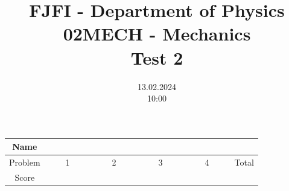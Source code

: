 \documentclass[a4paper,12pt]{article}
\title{{\Large FJFI - Department of Physics} \\ 
                  02MECH - Mechanics \\ 
          {\Large \textbf{Test 2}}\vspace{-1cm}}
\date{13.02.2024 \\ 10:00}
\author{}
\begin{document}
\maketitle
\vspace{-1.5em}

\begin{center}
    \renewcommand{\arraystretch}{2}
    \begin{tabular}{ |c|c|c|c|c|c| } 
        \hline
        Name& \multicolumn{5}{c|}{\phantom{~~~~~~~~~~~~~~~~~~~~~~~~~~~~~~~~~~~~~~~~~~~~~~~~~~~~~~~~~~~~~~~~~~~~~~~~~~~~~~~}}\\
        \hline
        Problem & ~~~~1~~~~ & ~~~~2~~~~ & ~~~~3~~~~ & ~~~~4~~~~ & Total \\ 
        \hline
        Score & &  & & & \\
        \hline
    \end{tabular}
\end{center}

\vspace*{1cm}







\end{document}
